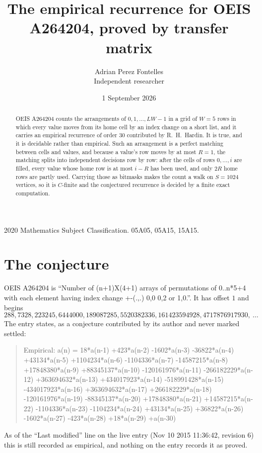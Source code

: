 \documentclass[11pt,a4paper]{article}
\title{The empirical recurrence for OEIS A264204, proved by transfer matrix}
\author{Adrian Perez Fontelles\\ \small Independent researcher}
\date{1 September 2026}
\theoremstyle{plain}
\theoremstyle{definition}
\begin{document}
\maketitle

\begin{abstract}
OEIS A264204 counts the arrangements of $0,1,\dots,LW-1$ in a grid of $W=5$ rows in which
every value moves from its home cell by an index change on a short list, and it carries an
empirical recurrence of order $30$ contributed by R.~H.~Hardin. It is true, and it is
decidable rather than empirical. Such an arrangement is a perfect matching between cells and
values, and because a value's row moves by at most $R=1$, the matching splits into
independent decisions row by row: after the cells of rows $0,\dots,i$ are filled,
every value whose home row is at most $i-R$ has been used, and only $2R$ home rows are
partly used. Carrying those as bitmasks makes the count a walk on $S=1024$ vertices, so it is
$C$-finite and the conjectured recurrence is decided by a finite exact computation.
\end{abstract}

\noindent\small 2020 Mathematics Subject Classification. 05A05, 05A15, 15A15.\normalsize

\section{The conjecture}

OEIS A264204 is ``Number of (n+1)X(4+1) arrays of permutations of 0..n*5+4 with each element having index change +-(.,.) 0,0 0,2 or 1,0.''. It has offset $1$ and begins
\[
288, 7328, 223245, 6444000, 189087285, 5520382336, 161423594928, 4717876917930,\ \dots
\]
The entry states, as a conjecture contributed by its author and never marked settled:
\begin{quote}
Empirical: a(n) = 18*a(n-1) +423*a(n-2) -1602*a(n-3) -36822*a(n-4) +43134*a(n-5) +1104234*a(n-6) -1104336*a(n-7) -14587215*a(n-8) +17848380*a(n-9) +88345137*a(n-10) -120161976*a(n-11) -266182229*a(n-12) +363694632*a(n-13) +434017923*a(n-14) -518991428*a(n-15) -434017923*a(n-16) +363694632*a(n-17) +266182229*a(n-18) -120161976*a(n-19) -88345137*a(n-20) +17848380*a(n-21) +14587215*a(n-22) -1104336*a(n-23) -1104234*a(n-24) +43134*a(n-25) +36822*a(n-26) -1602*a(n-27) -423*a(n-28) +18*a(n-29) +a(n-30)
\end{quote}
As of the ``Last modified'' line on the live entry (Nov 10 2015 11:36:42, revision 6) this is still
recorded as empirical, and nothing on the entry records it as proved.
\end{document}
